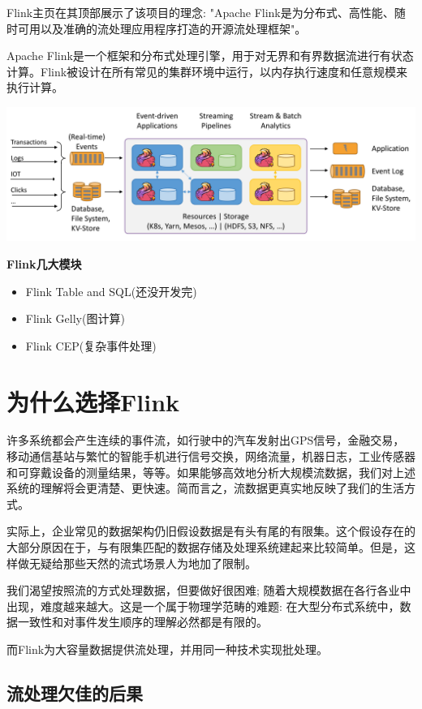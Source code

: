 \documentclass[oneside]{ctexbook}
\begin{document}
Flink主页在其顶部展示了该项目的理念: "Apache Flink是为分布式、高性能、随时可用以及准确的流处理应用程序打造的开源流处理框架"。

Apache Flink是一个框架和分布式处理引擎，用于对无界和有界数据流进行有状态计算。Flink被设计在所有常见的集群环境中运行，以内存执行速度和任意规模来执行计算。

\noindent \includegraphics[width=\textwidth]{flink-home-graphic.png}

\textbf{Flink几大模块}

\begin{itemize}
\item Flink Table and SQL(还没开发完)
\item Flink Gelly(图计算)
\item Flink CEP(复杂事件处理)
\end{itemize}

\section{为什么选择Flink}

许多系统都会产生连续的事件流，如行驶中的汽车发射出GPS信号，金融交易，移动通信基站与繁忙的智能手机进行信号交换，网络流量，机器日志，工业传感器和可穿戴设备的测量结果，等等。如果能够高效地分析大规模流数据，我们对上述系统的理解将会更清楚、更快速。简而言之，流数据更真实地反映了我们的生活方式。

实际上，企业常见的数据架构仍旧假设数据是有头有尾的有限集。这个假设存在的大部分原因在于，与有限集匹配的数据存储及处理系统建起来比较简单。但是，这样做无疑给那些天然的流式场景人为地加了限制。

我们渴望按照流的方式处理数据，但要做好很困难; 随着大规模数据在各行各业中出现，难度越来越大。这是一个属于物理学范畴的难题: 在大型分布式系统中，数据一致性和对事件发生顺序的理解必然都是有限的。

而Flink为大容量数据提供流处理，并用同一种技术实现批处理。

\subsection{流处理欠佳的后果}
\end{document}
